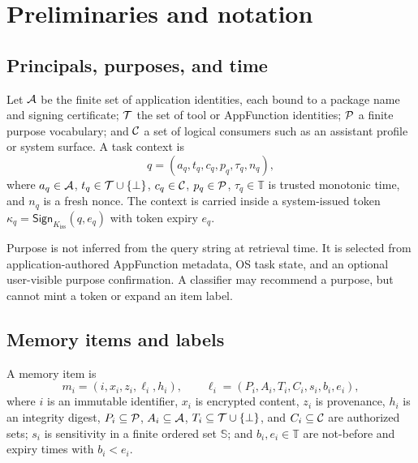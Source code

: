 \section{Preliminaries and notation}
\label{sec:preliminaries}

\subsection{Principals, purposes, and time}

Let $\mathcal{A}$ be the finite set of application identities, each bound to a package name and signing certificate; $\mathcal{T}$ the set of tool or AppFunction identities; $\mathcal{P}$ a finite purpose vocabulary; and $\mathcal{C}$ a set of logical consumers such as an assistant profile or system surface. A task context is
\begin{equation}
q=(a_q,t_q,c_q,p_q,\tau_q,n_q),
\label{eq:query-context}
\end{equation}
where $a_q\in\mathcal{A}$, $t_q\in\mathcal{T}\cup\{\bot\}$, $c_q\in\mathcal{C}$, $p_q\in\mathcal{P}$, $\tau_q\in\mathbb{T}$ is trusted monotonic time, and $n_q$ is a fresh nonce. The context is carried inside a system-issued token $\kappa_q=\mathsf{Sign}_{K_{\mathrm{iss}}}(q,e_q)$ with token expiry $e_q$.

Purpose is not inferred from the query string at retrieval time. It is selected from application-authored AppFunction metadata, OS task state, and an optional user-visible purpose confirmation. A classifier may recommend a purpose, but cannot mint a token or expand an item label.

\subsection{Memory items and labels}

\begin{definition}
A memory item is
\begin{equation}
m_i=(i,x_i,z_i,\ell_i,h_i),\qquad
\ell_i=(P_i,A_i,T_i,C_i,s_i,b_i,e_i),
\label{eq:item}
\end{equation}
where $i$ is an immutable identifier, $x_i$ is encrypted content, $z_i$ is provenance, $h_i$ is an integrity digest, $P_i\subseteq\mathcal{P}$, $A_i\subseteq\mathcal{A}$, $T_i\subseteq\mathcal{T}\cup\{\bot\}$, and $C_i\subseteq\mathcal{C}$ are authorized sets; $s_i$ is sensitivity in a finite ordered set $\mathbb{S}$; and $b_i,e_i\in\mathbb{T}$ are not-before and expiry times with $b_i<e_i$.
\end{definition}

